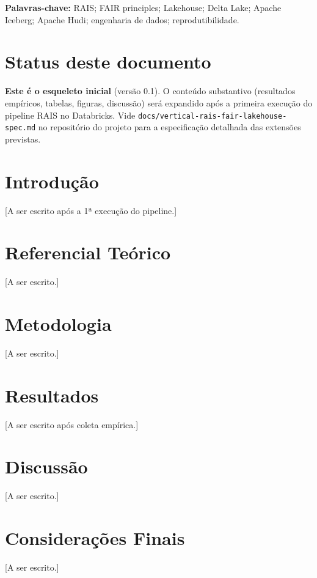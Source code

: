 \documentclass[12pt,a4paper,oneside]{article}
\begin{document}
\vspace{0.4cm}\noindent\textbf{Palavras-chave:}
RAIS; FAIR principles; Lakehouse; Delta Lake; Apache Iceberg; Apache
Hudi; engenharia de dados; reprodutibilidade.

\section*{Status deste documento}
\textbf{Este é o esqueleto inicial} (versão 0.1). O conteúdo
substantivo (resultados empíricos, tabelas, figuras, discussão)
será expandido após a primeira execução do pipeline RAIS no
Databricks. Vide \texttt{docs/vertical-rais-fair-lakehouse-spec.md}
no repositório do projeto para a especificação detalhada das
extensões previstas.

\section{Introdução}\label{sec:intro}
[A ser escrito após a 1ª execução do pipeline.]

\section{Referencial Teórico}\label{sec:teoria}
[A ser escrito.]

\section{Metodologia}\label{sec:metodo}
[A ser escrito.]

\section{Resultados}\label{sec:resultados}
[A ser escrito após coleta empírica.]

\section{Discussão}\label{sec:discussao}
[A ser escrito.]

\section{Considerações Finais}\label{sec:conclusao}
[A ser escrito.]
\end{document}

